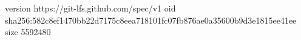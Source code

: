 version https://git-lfs.github.com/spec/v1
oid sha256:582c8ef1470bb22d7175c8eea718101fc07fb876ae0a35600b9d3e1815ee41ee
size 5592480
